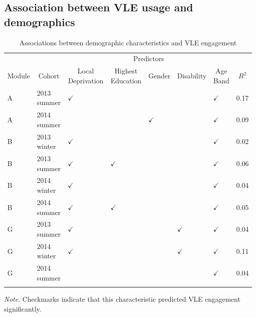 \documentclass[
  english,
  man,mask,floatsintext]{apa6}
\begin{document}
\hypertarget{association-between-vle-usage-and-demographics}{%
\subsection{Association between VLE usage and demographics}\label{association-between-vle-usage-and-demographics}}

\begin{table}[tbp]

\begin{center}
\begin{threeparttable}

\caption{\label{tab:dem-vle-associations}Associations between demographic characteristics and VLE engagement}

\footnotesize{

\begin{tabular}{llllllll}
\toprule
 &  & \multicolumn{5}{c}{Predictors}  &\\
\cmidrule(r){3-7}
Module & \multicolumn{1}{c}{Cohort} & \multicolumn{1}{c}{Local Deprivation} & \multicolumn{1}{c}{Highest Education} & \multicolumn{1}{c}{Gender} & \multicolumn{1}{c}{Disability} & \multicolumn{1}{c}{Age Band} & \multicolumn{1}{c}{$R^2$}\\
\midrule
A & 2013 summer & $\checkmark$ &  &  &  & $\checkmark$ & 0.17\\
A & 2014 summer &  &  & $\checkmark$ &  & $\checkmark$ & 0.09\\ \midrule
B & 2013 winter & $\checkmark$ &  &  &  & $\checkmark$ & 0.02\\
B & 2013 summer & $\checkmark$ & $\checkmark$ &  &  & $\checkmark$ & 0.06\\
B & 2014 winter & $\checkmark$ &  &  &  & $\checkmark$ & 0.04\\
B & 2014 summer & $\checkmark$ & $\checkmark$ &  &  & $\checkmark$ & 0.05\\ \midrule
G & 2013 summer & $\checkmark$ &  &  & $\checkmark$ & $\checkmark$ & 0.04\\
G & 2014 winter & $\checkmark$ &  &  & $\checkmark$ & $\checkmark$ & 0.11\\
G & 2014 summer &  &  &  &  & $\checkmark$ & 0.04\\
\bottomrule
\addlinespace
\end{tabular}

}

\begin{tablenotes}[para]
\normalsize{\textit{Note.} Checkmarks indicate that this characteristic predicted VLE engagement significantly.}
\end{tablenotes}

\end{threeparttable}
\end{center}

\end{table}
\end{document}
